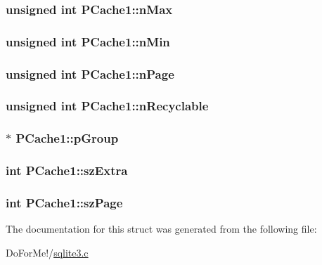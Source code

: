 \hypertarget{struct_p_cache1_aef08139a0b86b0c0a7ee2bec0bab2405}{
\subsubsection[{n\-Max}]{\setlength{\rightskip}{0pt plus 5cm}unsigned int P\-Cache1\-::n\-Max}}\label{struct_p_cache1_aef08139a0b86b0c0a7ee2bec0bab2405}
\hypertarget{struct_p_cache1_a9e96c79ec60c2e368f92a2ba52d01c44}{
\subsubsection[{n\-Min}]{\setlength{\rightskip}{0pt plus 5cm}unsigned int P\-Cache1\-::n\-Min}}\label{struct_p_cache1_a9e96c79ec60c2e368f92a2ba52d01c44}
\hypertarget{struct_p_cache1_ace332c276e28352992529f60f0ac457c}{
\subsubsection[{n\-Page}]{\setlength{\rightskip}{0pt plus 5cm}unsigned int P\-Cache1\-::n\-Page}}\label{struct_p_cache1_ace332c276e28352992529f60f0ac457c}
\hypertarget{struct_p_cache1_a3501394bd251f08d1f9d26d3b2d4c67c}{
\subsubsection[{n\-Recyclable}]{\setlength{\rightskip}{0pt plus 5cm}unsigned int P\-Cache1\-::n\-Recyclable}}\label{struct_p_cache1_a3501394bd251f08d1f9d26d3b2d4c67c}
\hypertarget{struct_p_cache1_ae3389f0c68d6946a1eebeeee835ece69}{
\subsubsection[{p\-Group}]{$\ast$ P\-Cache1\-::p\-Group}}\label{struct_p_cache1_ae3389f0c68d6946a1eebeeee835ece69}
\hypertarget{struct_p_cache1_a1e96e6671732e0af641732991b681ede}{
\subsubsection[{sz\-Extra}]{\setlength{\rightskip}{0pt plus 5cm}int P\-Cache1\-::sz\-Extra}}\label{struct_p_cache1_a1e96e6671732e0af641732991b681ede}
\hypertarget{struct_p_cache1_a1425039a858b7518c097d8ae92597de0}{
\subsubsection[{sz\-Page}]{\setlength{\rightskip}{0pt plus 5cm}int P\-Cache1\-::sz\-Page}}\label{struct_p_cache1_a1425039a858b7518c097d8ae92597de0}


The documentation for this struct was generated from the following file\-:\begin{DoxyCompactItemize}
\item 
Do\-For\-Me!/\hyperlink{sqlite3_8c}{sqlite3.\-c}\end{DoxyCompactItemize}
